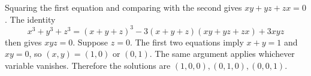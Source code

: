 Squaring the first equation and comparing with the second gives $xy+yz+zx=0$. The identity
\[
x^3+y^3+z^3=(x+y+z)^3-3(x+y+z)(xy+yz+zx)+3xyz
\]
then gives $xyz=0$. Suppose $z=0$. The first two equations imply $x+y=1$ and $xy=0$, so $(x,y)=(1,0)$ or $(0,1)$. The same argument applies whichever variable vanishes. Therefore the solutions are $\boxed{(1,0,0),(0,1,0),(0,0,1)}$.
